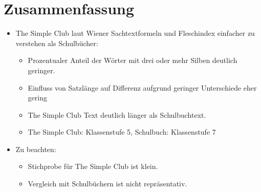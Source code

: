 \documentclass[
	aspectratio=169, %
	8pt, %
]{beamer}
\begin{document}
\begin{frame}
\begin{mycolumns}
	\end{mycolumns}
\end{frame}


\section{Zusammenfassung}

\begin{frame}{\insertsection}
	\begin{itemize}
		\item The Simple Club laut Wiener Sachtextformeln und Fleschindex einfacher zu verstehen als Schulbücher:
		\begin{itemize}
			\item Prozentualer Anteil der Wörter mit drei oder mehr Silben deutlich geringer.
			\item Einfluss von Satzlänge auf Differenz aufgrund geringer Unterschiede eher gering
			\item The Simple Club Text deutlich länger als Schulbuchtext.
			\item The Simple Club: Klassenstufe 5, Schulbuch: Klassenstufe 7
		\end{itemize}
		\item Zu beachten: 
		\begin{itemize}
			\item Stichprobe für The Simple Club ist klein.
			\item Vergleich mit Schulbüchern ist nicht repräsentativ.
		\end{itemize}
	\end{itemize}
\end{frame}
\end{document}
